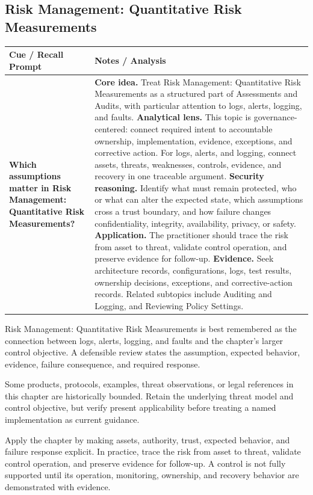 \documentclass[11pt]{article}
\newcommand{\CornellHeader}{%
\rowcolor{Navy}\color{white}\bfseries Cue / Recall Prompt & \color{white}\bfseries Notes / Analysis\\\hline}
\newcommand{\CornellRow}[2]{%
\cellcolor{CueGray}\RaggedRight\textbf{#1} & \RaggedRight #2\\\hline}
\begin{document}
\subsection*{Risk Management: Quantitative Risk Measurements}
\begin{longtable}{>{\RaggedRight\arraybackslash}p{}|>{\RaggedRight\arraybackslash}p{}}
\CornellHeader
\CornellRow{Which assumptions matter in Risk Management: Quantitative Risk Measurements?}{\textbf{Core idea.} Treat Risk Management: Quantitative Risk Measurements as a structured part of Assessments and Audits, with particular attention to logs, alerts, logging, and faults. \textbf{Analytical lens.} This topic is governance-centered: connect required intent to accountable ownership, implementation, evidence, exceptions, and corrective action. For logs, alerts, and logging, connect assets, threats, weaknesses, controls, evidence, and recovery in one traceable argument. \textbf{Security reasoning.} Identify what must remain protected, who or what can alter the expected state, which assumptions cross a trust boundary, and how failure changes confidentiality, integrity, availability, privacy, or safety. \textbf{Application.} The practitioner should trace the risk from asset to threat, validate control operation, and preserve evidence for follow-up. \textbf{Evidence.} Seek architecture records, configurations, logs, test results, ownership decisions, exceptions, and corrective-action records. Related subtopics include Auditing and Logging, and Reviewing Policy Settings.}
\end{longtable}
\begin{topicsummary}
Risk Management: Quantitative Risk Measurements is best remembered as the connection between logs, alerts, logging, and faults and the chapter's larger control objective. A defensible review states the assumption, expected behavior, evidence, failure consequence, and required response.
\end{topicsummary}
\begin{historybox}
Some products, protocols, examples, threat observations, or legal references in this chapter are historically bounded. Retain the underlying threat model and control objective, but verify present applicability before treating a named implementation as current guidance.
\end{historybox}
\begin{defensebox}
Apply the chapter by making assets, authority, trust, expected behavior, and failure response explicit. In practice, trace the risk from asset to threat, validate control operation, and preserve evidence for follow-up. A control is not fully supported until its operation, monitoring, ownership, and recovery behavior are demonstrated with evidence.
\end{defensebox}
\end{document}
